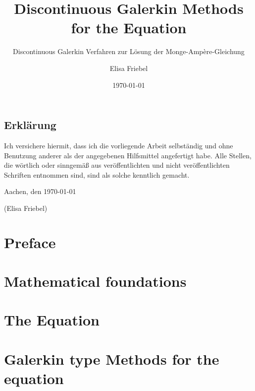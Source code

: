 \documentclass{template}
\title{Discontinuous Galerkin Methods for the \MA Equation}
\subtitle{\Large Discontinuous Galerkin Verfahren zur Lösung der Monge-Amp\`ere-Gleichung}
\author{Elisa Friebel} %
\date{\today}
\begin{document}
\maketitle

\begin{center}
\begin{minipage}[t]{0.8\textwidth}

\chapter*{Erklärung}
Ich versichere hiermit, dass ich die vorliegende Arbeit selbständig und
ohne Benutzung anderer als der angegebenen Hilfsmittel angefertigt habe.
Alle Stellen, die wörtlich oder sinngemäß aus veröffentlichten und nicht
veröffentlichten Schriften entnommen sind, sind als solche kenntlich
gemacht.

\vspace{1cm}
Aachen, den \today

\vspace{2cm}
(Elisa Friebel)
\end{minipage}
\end{center}
\thispagestyle{empty}
\cleardoublepage

\tableofcontents{}

\setcounter{page}{1}


\chapter*{Preface}
\label{ch:preface}


\chapter{Mathematical foundations}
\label{ch:TheoreticalBackground}



\chapter{The \MA Equation}
\label{ch:MongeAmpereEq}



\chapter{Galerkin type Methods for the \MA equation}
\label{ch:DGMongeAmpere}

\end{document}
